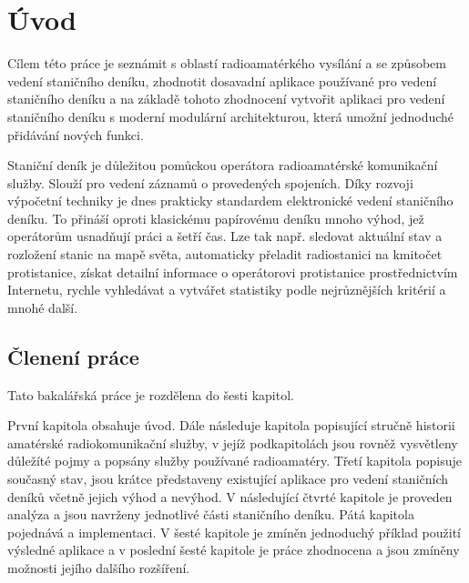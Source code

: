 \chapter{Úvod}
\label{uvod}

Cílem této práce je seznámit s oblastí radioamatérkého vysílání a se způsobem vedení staničního deníku,
zhodnotit dosavadní aplikace používané pro vedení staničního deníku a 
na základě tohoto zhodnocení vytvořit aplikaci pro vedení staničního deníku s moderní modulární architekturou,
která umožní jednoduché přidávání nových funkci.

Staniční deník je důležitou pomůckou operátora radioamatérské komunikační
služby. Slouží pro vedení záznamů o provedených spojeních.
Díky rozvoji výpočetní techniky je dnes prakticky standardem
elektronické vedení staničního deníku.
To přináší oproti klasickému papírovému deníku mnoho výhod, jež
operátorům usnadňují práci a šetří čas. Lze tak např. sledovat aktuální stav a
rozložení stanic na mapě světa, automaticky přeladit radiostanici na kmitočet
protistanice, získat detailní informace o operátorovi protistanice
prostřednictvím Internetu, rychle vyhledávat a vytvářet statistiky podle nejrůznějších kritérií a
mnohé další.

\section{Členení práce}

Tato bakalářská  práce je rozdělena do šesti kapitol.

První kapitola obsahuje úvod. Dále následuje kapitola popisující stručně historii amatérské radiokomunikační služby,
v jejíž podkapitolách jsou rovněž vysvětleny důležíté pojmy a popsány služby používané radioamatéry.
Třetí kapitola popisuje současný stav, jsou krátce představeny existující
aplikace pro vedení staničních deníků včetně jejich výhod a nevýhod. V
následující čtvrté kapitole je proveden analýza a jsou navrženy jednotlivé části staničního deníku.
Pátá kapitola pojednává a implementaci. V šesté kapitole je zmíněn jednoduchý příklad použití výsledné aplikace
 a v poslední šesté kapitole je práce zhodnocena a jsou zmíněny možnosti jejího
 dalšího rozšíření.



